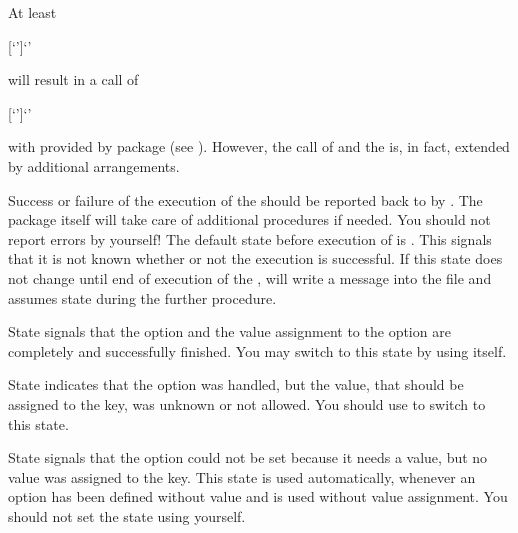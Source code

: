 \begin{Explain}
  \label{explain:scrbase.macro.DefineFamilyKey}%
  At least
\begin{lstcode}[escapeinside=`']
                  [`']{`'}
\end{lstcode}
  will result in a call of
\begin{lstcode}[moretexcs={define@key},escapeinside=`']
             [`']{`'}
\end{lstcode}
  with  provided by package
   (see \cite{package:keyval}). However,
  the call of  and the  is, in fact, 
  extended by additional arrangements.
\end{Explain}

Success or failure of the execution of the
 should be reported back to  by
. The package itself will take care of additional
procedures if needed. You should not report errors by yourself! The default
state before execution of  is
. This signals that it is not known whether or
not the execution is successful. If this state does not change until end of
execution of the ,  will write a message into
the  file and assumes state  during
the further procedure.

State  signals that the option and the value
assignment to the option are completely and successfully finished. You may
switch to this state by using  itself.

State  indicates that the option was
handled, but the value, that should be assigned to the key, was unknown or not
allowed. You should use  to switch to
this state.

State  signals that the option could not be
set because it needs a value, but no value was assigned to the
key. This state is used automatically, whenever an option has been
defined without  value and is used without value
assignment. You should not set the state using 
yourself.

